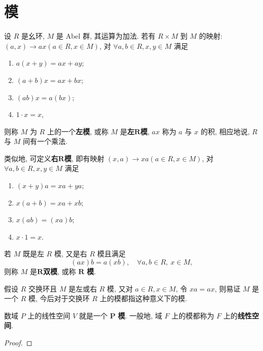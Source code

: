 \documentclass[../../main.tex]{subfiles}
\begin{document}
\section{模}

\begin{definition}[模]
设 \( R \) 是幺环, \( M \) 是 Abel 群, 其运算为加法. 若有 \( R \times M \) 到 \( M \) 的映射: \( (a,x) \to ax (a \in R, x \in M) \), 对 \( \forall a,b \in R, x,y \in M \) 满足
\begin{enumerate}[(1)]
\item \( a(x + y) = ax + ay \);
\item \( (a + b)x = ax + bx \);
\item \( (ab)x = a(bx) \);
\item \( 1 \cdot x = x \),
\end{enumerate}
则称 \( M \) 为 \( R \) 上的一个\textbf{左模}, 或称 \( M \) 是\textbf{左}\(\boldsymbol{R}\)\textbf{模}, \( ax \) 称为 \( a \) 与 \( x \) 的积, 相应地说, \( R \) 与 \( M \) 间有一个乘法.

类似地, 可定义\textbf{右}\(\boldsymbol{R}\)\textbf{模}, 即有映射 \( (x,a) \to xa (a \in R, x \in M) \), 对 \( \forall a,b \in R, x,y \in M \) 满足
\begin{enumerate}[(1)]
\item \( (x + y)a = xa + ya \);
\item \( x(a + b) = xa + xb \);
\item \( x(ab) = (xa)b \);
\item \( x \cdot 1 = x \).
\end{enumerate}

若 \( M \) 既是左 \( R \) 模, 又是右 \( R \) 模且满足
\[
(ax)b = a(xb), \quad \forall a,b \in R, \ x \in M,
\]
则称 \( M \) 是\(\boldsymbol{R}\)\textbf{双模}, 或称 \( \boldsymbol{R} \) \textbf{模}.
\end{definition}
\begin{remark}
假设 \( R \) 交换环且 \( M \) 是左或右 \( R \) 模, 又对 \( a \in R, x \in M \), 令 \( xa = ax \), 则易证 \( M \) 是一个 \( R \) 模, 今后对于交换环 \( R \) 上的模都指这种意义下的模.
\end{remark}

\begin{example}
数域 \( P \) 上的线性空间 \( V \) 就是一个 \( \boldsymbol{P} \) \textbf{模}. 一般地, 域 \( F \) 上的模都称为 \( F \) 上的\textbf{线性空间}.
\end{example}
\begin{proof}


\end{proof}
\end{document}
